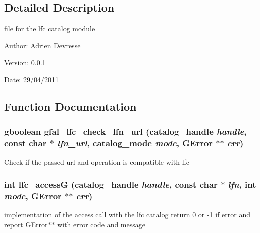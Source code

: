 \subsection{Detailed Description}
file for the lfc catalog module 

\begin{Desc}
\item[Author:]Adrien Devresse \end{Desc}
\begin{Desc}
\item[Version:]0.0.1 \end{Desc}
\begin{Desc}
\item[Date:]29/04/2011 \end{Desc}


\subsection{Function Documentation}
\subsubsection{\setlength{\rightskip}{0pt plus 5cm}gboolean gfal\_\-lfc\_\-check\_\-lfn\_\-url (catalog\_\-handle {\em handle}, const char $\ast$ {\em lfn\_\-url}, catalog\_\-mode {\em mode}, GError $\ast$$\ast$ {\em err})}\label{gfal__common__lfc_8c_8baa624b528deb15ff4ee61fa9948ac8}


Check if the passed url and operation is compatible with lfc 
\subsubsection{\setlength{\rightskip}{0pt plus 5cm}int lfc\_\-access\-G (catalog\_\-handle {\em handle}, const char $\ast$ {\em lfn}, int {\em mode}, GError $\ast$$\ast$ {\em err})}\label{gfal__common__lfc_8c_c5d7bae3ad9aea9f912d6b91f8d5731e}


implementation of the access call with the lfc catalog return 0 or -1 if error and report GError$\ast$$\ast$ with error code and message 
